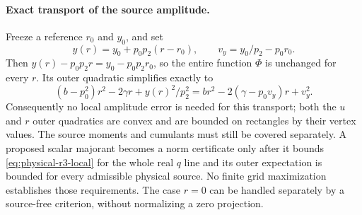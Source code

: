 \paragraph{Exact transport of the source amplitude.}
Freeze a reference $r_0$ and $y_0$, and set
\[
 y(r)=y_0+p_0p_2(r-r_0),\qquad v_y=y_0/p_2-p_0r_0.
\]
Then $y(r)-p_0p_2r=y_0-p_0p_2r_0$, so the entire function $\Phi$ is
unchanged for every $r$.  Its outer quadratic simplifies exactly to
\begin{equation}\label{eq:physical-r3-transport}
 (b-p_0^2)r^2-2\gamma r+y(r)^2/p_2^2
 =br^2-2(\gamma-p_0v_y)r+v_y^2.
\end{equation}
Consequently no local amplitude error is needed for this transport;
both the $u$ and $r$ outer quadratics are convex and are bounded on
rectangles by their vertex values.  The source moments and cumulants
must still be covered separately.  A proposed scalar majorant becomes
a norm certificate only after it bounds \eqref{eq:physical-r3-local}
for the whole real $q$ line and its outer expectation is bounded for
every admissible physical source.  No finite grid maximization establishes
those requirements.  The case $r=0$ can be handled separately by a
source-free criterion, without normalizing a zero projection.
